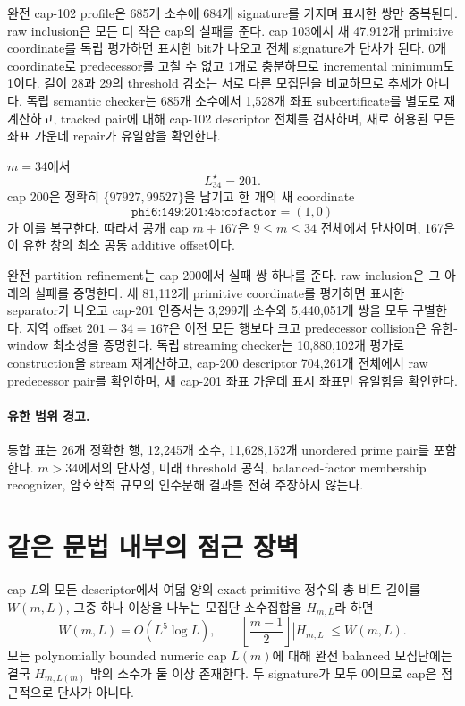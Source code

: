 \documentclass[11pt]{article}
\begin{document}
\begin{claimproof}
완전 cap-102 profile은 685개 소수에 684개 signature를 가지며 표시한
쌍만 중복된다. raw inclusion은 모든 더 작은 cap의 실패를 준다. cap
103에서 새 47,912개 primitive coordinate를 독립 평가하면 표시한 bit가
나오고 전체 signature가 단사가 된다. 0개 coordinate로 predecessor를
고칠 수 없고 1개로 충분하므로 incremental minimum도 1이다. 길이 28과
29의 threshold 감소는 서로 다른 모집단을 비교하므로 추세가 아니다.
독립 semantic checker는 685개 소수에서 1,528개 좌표 subcertificate를 별도로
재계산하고, tracked pair에 대해 cap-102 descriptor 전체를 검사하며,
새로 허용된 모든 좌표 가운데 repair가 유일함을 확인한다.
\end{claimproof}

{}
\(m=34\)에서
\[
L_{34}^\star=201.
\]
cap 200은 정확히 \(\{97927,99527\}\)을 남기고 한 개의 새 coordinate
\[
\texttt{phi6:149:201:45:cofactor}=(1,0)
\]
가 이를 복구한다. 따라서 공개 cap \(m+167\)은
\(9\le m\le34\) 전체에서 단사이며, 167은 이 유한 창의 최소 공통
additive offset이다.

\begin{claimproof}
완전 partition refinement는 cap 200에서 실패 쌍 하나를 준다. raw
inclusion은 그 아래의 실패를 증명한다. 새 81,112개 primitive
coordinate를 평가하면 표시한 separator가 나오고 cap-201 인증서는
3,299개 소수와 5,440,051개 쌍을 모두 구별한다. 지역 offset
\(201-34=167\)은 이전 모든 행보다 크고 predecessor collision은
유한-window 최소성을 증명한다. 독립 streaming checker는
10,880,102개 평가로
construction을 stream 재계산하고, cap-200 descriptor 704,261개 전체에서
raw predecessor pair를 확인하며, 새 cap-201 좌표 가운데 표시 좌표만
유일함을 확인한다.
\end{claimproof}

\paragraph{유한 범위 경고.}
통합 표는 26개 정확한 행, 12,245개 소수, 11,628,152개 unordered
prime pair를 포함한다. \(m>34\)에서의 단사성, 미래 threshold 공식,
balanced-factor membership recognizer, 암호학적 규모의 인수분해
결과를 전혀 주장하지 않는다.

\section{같은 문법 내부의 점근 장벽}

{}
cap \(L\)의 모든 descriptor에서 여덟
양의 exact primitive 정수의 총 비트 길이를 \(W(m,L)\), 그중 하나
이상을 나누는 모집단 소수집합을 \(H_{m,L}\)라 하면
\[
W(m,L)=O(L^5\log L),\qquad
\left\lfloor\frac{m-1}{2}\right\rfloor|H_{m,L}|\le W(m,L).
\]
모든 polynomially bounded numeric cap \(L(m)\)에 대해 완전 balanced
모집단에는 결국 \(H_{m,L(m)}\) 밖의 소수가 둘 이상 존재한다. 두
signature가 모두 0이므로 cap은 점근적으로 단사가 아니다.
\end{document}
